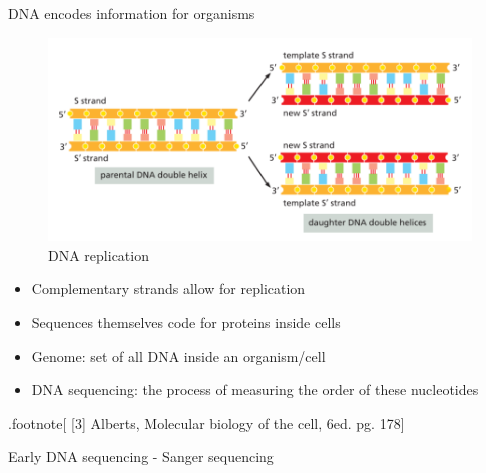\documentclass[
  ignorenonframetext,
]{beamer}
\providecommand{\tightlist}{%
  \setlength{\itemsep}{0pt}\setlength{\parskip}{0pt}}
\begin{document}
\begin{frame}{DNA encodes information for organisms}
\protect\hypertarget{dna-encodes-information-for-organisms}{}

\begin{figure}
\centering
\includegraphics{dna-replication.png}
\caption{DNA replication}
\end{figure}

\begin{itemize}
\tightlist
\item
  Complementary strands allow for replication
\item
  Sequences themselves code for proteins inside cells
\item
  Genome: set of all DNA inside an organism/cell
\item
  DNA sequencing: the process of measuring the order of these
  nucleotides
\end{itemize}

.footnote{[} {[}3{]} Alberts, Molecular biology of the cell, 6ed. pg.
178{]}

\end{frame}

\begin{frame}{Early DNA sequencing - Sanger sequencing}
\protect\hypertarget{early-dna-sequencing---sanger-sequencing}{}

\end{frame}
\end{document}
